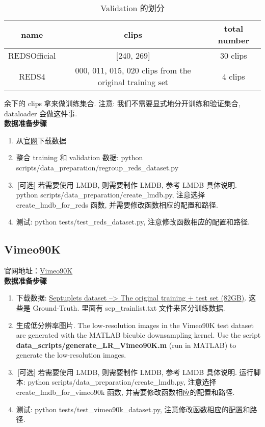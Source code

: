 \documentclass[../main.tex]{subfiles}
\begin{document}
\begin{table}[htbp]
    \centering
        \begin{tabular}{|c|c|c|}
            \hline
            \textbf{name} & \textbf{clips} & \textbf{total number}                               \\ \hline
            REDSOfficial              & [240, 269]      & 30 clips                               \\ \hline
            REDS4          & 000, 011, 015, 020 clips from the original training set      & 4 clips       \\ \hline
        \end{tabular}
    \caption{Validation 的划分}
\end{table}
余下的 clips 拿来做训练集合. 注意: 我们不需要显式地分开训练和验证集合, dataloader 会做这件事.\\

\noindent\textbf{数据准备步骤}

\begin{enumerate}
\item 从\href{https://seungjunnah.github.io/Datasets/reds.html}{官网}下载数据
\item 整合 training 和 validation 数据: python scripts/data\_preparation/regroup\_reds\_dataset.py
\item\,[可选] 若需要使用 LMDB, 则需要制作 LMDB, 参考 LMDB 具体说明. python scripts/data\_preparation/create\_lmdb.py, 注意选择 create\_lmdb\_for\_reds 函数, 并需要修改函数相应的配置和路径.
\item 测试: python tests/test\_reds\_dataset.py, 注意修改函数相应的配置和路径.
\end{enumerate}

\subsection{Vimeo90K}

官网地址：\href{http://toflow.csail.mit.edu/}{Vimeo90K}\\

\noindent\textbf{数据准备步骤}
\begin{enumerate}
\item 下载数据: \href{http://data.csail.mit.edu/tofu/dataset/vimeo_septuplet.zip}{Septuplets dataset --> The original training + test set (82GB)}. 这些是 Ground-Truth. 里面有 sep\_trainlist.txt 文件来区分训练数据.
\item 生成低分辨率图片. The low-resolution images in the Vimeo90K test dataset are generated with the MATLAB bicubic downsampling kernel. Use the script \textbf{data\_scripts/generate\_LR\_Vimeo90K.m} (run in MATLAB) to generate the low-resolution images.
\item\,[可选] 若需要使用 LMDB, 则需要制作 LMDB, 参考 LMDB 具体说明. 运行脚本: python scripts/data\_preparation/create\_lmdb.py, 注意选择 create\_lmdb\_for\_vimeo90k 函数, 并需要修改函数相应的配置和路径.
\item 测试: python tests/test\_vimeo90k\_dataset.py, 注意修改函数相应的配置和路径.
\end{enumerate}
\end{document}
